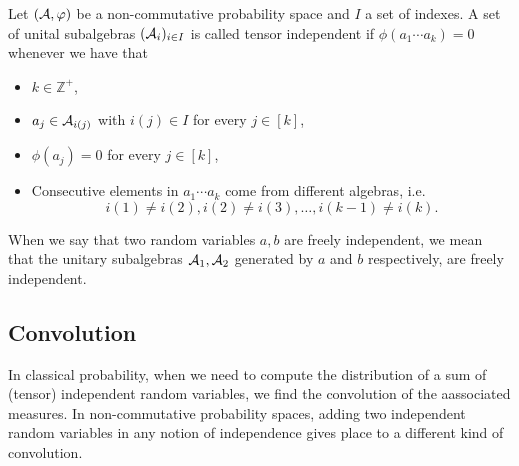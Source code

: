 

    \begin{definition}
        Let $(\mathcal A, \varphi)$ be a non-commutative probability space and $I$ a set of indexes. A set of unital subalgebras $(\mathcal A_{i})_{i\in I}$ is called tensor independent if $\phi(a_1 \cdots a_k) = 0$ whenever we have that

        \begin{itemize}
            \item $k \in \mathbb Z^+$,
            \item $a_j \in \mathcal A_{i(j)}$ with $i(j) \in I$ for every $j \in [k]$,
            \item $\phi(a_j) = 0$ for every $j \in [k]$,
            \item Consecutive elements in $a_1 \cdots a_k$ come from different algebras, i.e.
            \begin{equation*}
                i(1) \neq i(2), i(2) \neq i(3), \dots, i(k-1) \neq i(k).
            \end{equation*}
        \end{itemize}

        When we say that two random variables $a,b$ are freely independent, we mean that the unitary subalgebras $\mathcal A_1, \mathcal A_2$ generated by $a$ and $b$ respectively, are freely independent.

    \end{definition}


\subsection{Convolution}

    In classical probability, when we need to compute the distribution of a sum of (tensor) independent random variables, we find the convolution of the aassociated measures. In non-commutative probability spaces, adding two independent random variables in any notion of independence gives place to a different kind of convolution.

